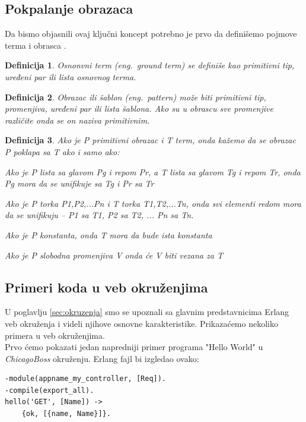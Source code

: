 \documentclass[a4paper]{article}
\newtheorem{definition}{Definicija}
\begin{document}
{\subsection{Pokpalanje obrazaca}
\label{sec:poklapanje_obrazaca_formalno}
Da bismo objasnili ovaj ključni koncept potrebno je prvo da definišemo pojmove terma i obrasca \cite{phdthesis}.

\theoremstyle{definition}
\begin{definition}{Osnonvni term (eng.~{\em ground term})}
se definiše kao primitivni tip, uređeni par ili lista osnovnog terma.
\end{definition}

\begin{definition}{Obrazac ili šablon (eng.~{\em pattern})}
može biti primitivni tip, promenjiva, uređeni par ili lista šablona.
Ako su u obrascu sve promenjive različite onda se on naziva primitivnim.
\end{definition}

\begin{definition}{}
Ako je P  primitivni obrazac i T term, onda kažemo da se obrazac P poklapa sa T ako i samo ako:
\begin{list}{•}{}
\item Ako je P lista sa glavom Pg i repom Pr, a T lista sa glavom Tg i repom Tr, onda Pg mora da se unifikuje sa Tg i Pr sa Tr
\item Ako je P torka {P1,P2,...Pn} i T torka {T1,T2,...Tn}, onda svi elementi redom mora da se unifikuju – P1 sa T1, P2 sa T2, ... Pn sa Tn.
\item Ako je P konstanta, onda T mora da bude ista konstanta
\item Ako je P slobodna promenjiva V onda će V biti vezana za T
\end{list}
\end{definition}



\subsection{Primeri koda u veb okruženjima}
\label{sec:dodatak_primeri_okruzenja}

U poglavlju \ref{sec:okruzenja} smo se upoznali sa glavnim predstavnicima Erlang veb okruženja i videli njihove osnovne karakteristike. Prikazaćemo nekoliko primera u veb okruženjima. \\ 

Prvo ćemo pokazati jedan napredniji primer programa "Hello World" u {\em ChicagoBoss} okruženju. Erlang fajl bi izgledao ovako:
\begin{verbatim}
-module(appname_my_controller, [Req]).
-compile(export_all).
hello('GET', [Name]) ->
	{ok, [{name, Name}]}.
\end{verbatim}

}
\end{document}
